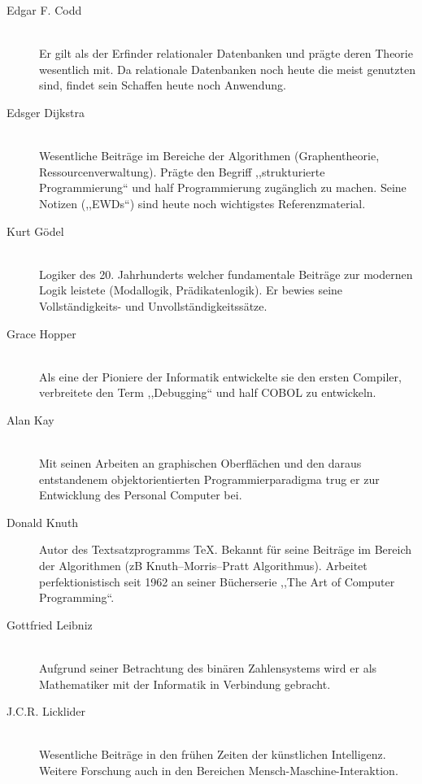 \begin{description}
  \item[Edgar F. Codd ] \hfill{} \\
    Er gilt als der Erfinder relationaler Datenbanken und prägte deren Theorie wesentlich mit. Da relationale Datenbanken noch heute die meist genutzten sind, findet sein Schaffen heute noch Anwendung.

  \item[Edsger Dijkstra ] \hfill{} \\
    Wesentliche Beiträge im Bereiche der Algorithmen (Graphentheorie, Ressourcenverwaltung).
    Prägte den Begriff ,,strukturierte Programmierung`` und half Programmierung zugänglich zu machen.
    Seine Notizen (,,EWDs``) sind heute noch wichtigstes Referenzmaterial.

  \item[Kurt Gödel ] \hfill{} \\
    Logiker des 20. Jahrhunderts welcher fundamentale Beiträge zur modernen Logik leistete
    (Modallogik, Prädikatenlogik). Er bewies seine Vollständigkeits- und Unvollständigkeitssätze.

  \item[Grace Hopper ] \hfill{} \\
    Als eine der Pioniere der Informatik entwickelte sie den ersten Compiler, verbreitete den Term ,,Debugging`` und half COBOL zu entwickeln.

  \item[Alan Kay ] \hfill{} \\
    Mit seinen Arbeiten an graphischen Oberflächen und den daraus entstandenem objektorientierten Programmierparadigma trug er zur Entwicklung des Personal Computer bei.

  \item[Donald Knuth ] \hfill{}
    Autor des Textsatzprogramms \TeX. Bekannt für seine Beiträge im Bereich der Algorithmen (zB Knuth–Morris–Pratt Algorithmus). Arbeitet perfektionistisch seit 1962 an seiner Bücherserie ,,The Art of Computer Programming``.

  \item[Gottfried Leibniz ] \hfill{} \\
    Aufgrund seiner Betrachtung des binären Zahlensystems wird er als Mathematiker mit der Informatik in Verbindung gebracht.

  \item[J.C.R. Licklider ] \hfill{} \\
    Wesentliche Beiträge in den frühen Zeiten der künstlichen Intelligenz.
    Weitere Forschung auch in den Bereichen Mensch-Maschine-Interaktion.


\end{description}
